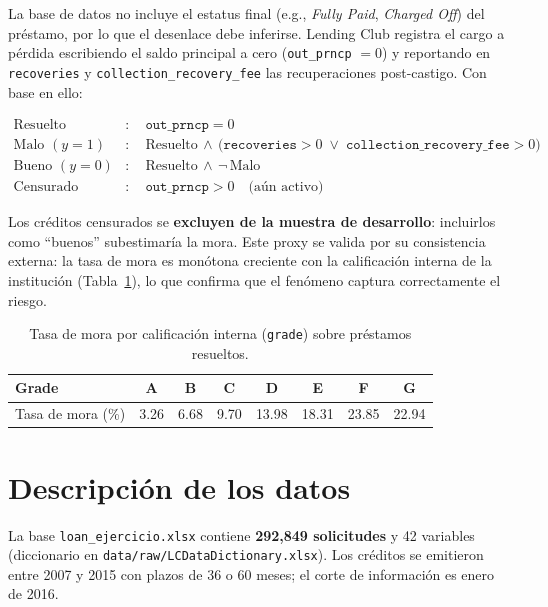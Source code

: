 \documentclass[11pt, letterpaper]{article}
\newcommand{\bt}[1]{\textbf{#1}}
\begin{document}
La base de datos no incluye el estatus final (e.g., \emph{Fully Paid},
\emph{Charged Off}) del préstamo, por lo que el desenlace debe inferirse.
Lending Club registra el cargo a pérdida escribiendo el saldo principal a
cero (\texttt{out\_prncp} $= 0$) y reportando en \texttt{recoveries} y
\texttt{collection\_recovery\_fee} las recuperaciones post-castigo. Con base
en ello:

\begin{align*}
  \text{Resuelto} &: \quad \texttt{out\_prncp} = 0 \\[2pt]
  \text{Malo } (y=1) &: \quad \text{Resuelto} \,\wedge\,
      \big(\texttt{recoveries} > 0 \;\vee\; \texttt{collection\_recovery\_fee} > 0\big) \\[2pt]
  \text{Bueno } (y=0) &: \quad \text{Resuelto} \,\wedge\, \neg\,\text{Malo} \\[2pt]
  \text{Censurado} &: \quad \texttt{out\_prncp} > 0 \quad\text{(aún activo)}
\end{align*}

Los créditos censurados se \bt{excluyen de la muestra de desarrollo}: incluirlos
como ``buenos'' subestimaría la mora. Este proxy se valida por su consistencia
externa: la tasa de mora es monótona creciente con la calificación interna de
la institución (Tabla~\ref{tab:proxy}), lo que confirma que el fenómeno
captura correctamente el riesgo.

\begin{table}[H]
  \centering
  \caption{Tasa de mora por calificación interna (\texttt{grade}) sobre préstamos resueltos.}
  \label{tab:proxy}
  \begin{tabular}{lccccccc}
    \toprule
    \bt{Grade}        & A      & B      & C      & D      & E      & F      & G \\
    \midrule
    Tasa de mora (\%) & 3.26   & 6.68   & 9.70   & 13.98  & 18.31  & 23.85  & 22.94 \\
    \bottomrule
  \end{tabular}
\end{table}

\section{Descripción de los datos}

La base \texttt{loan\_ejercicio.xlsx} contiene \bt{292,849 solicitudes} y 42
variables (diccionario en \texttt{data/raw/LCDataDictionary.xlsx}). Los
créditos se emitieron entre 2007 y 2015 con plazos de 36 o 60 meses; el corte
de información es enero de 2016.
\end{document}

